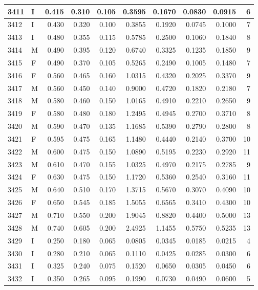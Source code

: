 \documentclass[9pt,twocolumn,twoside,]{pnas-new}
\begin{document}
\begin{tabular}{l|l|r|r|r|r|r|r|r|r}
\hline
3411 & I & 0.415 & 0.310 & 0.105 & 0.3595 & 0.1670 & 0.0830 & 0.0915 & 6\\
\hline
3412 & I & 0.430 & 0.320 & 0.100 & 0.3855 & 0.1920 & 0.0745 & 0.1000 & 7\\
\hline
3413 & I & 0.480 & 0.355 & 0.115 & 0.5785 & 0.2500 & 0.1060 & 0.1840 & 8\\
\hline
3414 & M & 0.490 & 0.395 & 0.120 & 0.6740 & 0.3325 & 0.1235 & 0.1850 & 9\\
\hline
3415 & F & 0.490 & 0.370 & 0.105 & 0.5265 & 0.2490 & 0.1005 & 0.1480 & 7\\
\hline
3416 & F & 0.560 & 0.465 & 0.160 & 1.0315 & 0.4320 & 0.2025 & 0.3370 & 9\\
\hline
3417 & M & 0.560 & 0.450 & 0.140 & 0.9000 & 0.4720 & 0.1820 & 0.2180 & 7\\
\hline
3418 & M & 0.580 & 0.460 & 0.150 & 1.0165 & 0.4910 & 0.2210 & 0.2650 & 9\\
\hline
3419 & F & 0.580 & 0.480 & 0.180 & 1.2495 & 0.4945 & 0.2700 & 0.3710 & 8\\
\hline
3420 & M & 0.590 & 0.470 & 0.135 & 1.1685 & 0.5390 & 0.2790 & 0.2800 & 8\\
\hline
3421 & F & 0.595 & 0.475 & 0.165 & 1.1480 & 0.4440 & 0.2140 & 0.3700 & 10\\
\hline
3422 & M & 0.600 & 0.475 & 0.150 & 1.0890 & 0.5195 & 0.2230 & 0.2920 & 11\\
\hline
3423 & M & 0.610 & 0.470 & 0.155 & 1.0325 & 0.4970 & 0.2175 & 0.2785 & 9\\
\hline
3424 & F & 0.630 & 0.475 & 0.150 & 1.1720 & 0.5360 & 0.2540 & 0.3160 & 11\\
\hline
3425 & M & 0.640 & 0.510 & 0.170 & 1.3715 & 0.5670 & 0.3070 & 0.4090 & 10\\
\hline
3426 & F & 0.650 & 0.545 & 0.185 & 1.5055 & 0.6565 & 0.3410 & 0.4300 & 10\\
\hline
3427 & M & 0.710 & 0.550 & 0.200 & 1.9045 & 0.8820 & 0.4400 & 0.5000 & 13\\
\hline
3428 & M & 0.740 & 0.605 & 0.200 & 2.4925 & 1.1455 & 0.5750 & 0.5235 & 13\\
\hline
3429 & I & 0.250 & 0.180 & 0.065 & 0.0805 & 0.0345 & 0.0185 & 0.0215 & 4\\
\hline
3430 & I & 0.280 & 0.210 & 0.065 & 0.1110 & 0.0425 & 0.0285 & 0.0300 & 6\\
\hline
3431 & I & 0.325 & 0.240 & 0.075 & 0.1520 & 0.0650 & 0.0305 & 0.0450 & 6\\
\hline
3432 & I & 0.350 & 0.265 & 0.095 & 0.1990 & 0.0730 & 0.0490 & 0.0600 & 5\\

\end{tabular}
\end{document}
